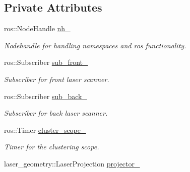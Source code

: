 \subsection*{Private Attributes}
\begin{DoxyCompactItemize}
\item 
ros\+::\+Node\+Handle \hyperlink{classLaserPredictor_a9535842866b44234078f0f69bbeb8539}{nh\+\_\+}\hypertarget{classLaserPredictor_a9535842866b44234078f0f69bbeb8539}{}\label{classLaserPredictor_a9535842866b44234078f0f69bbeb8539}

\begin{DoxyCompactList}\small\item\em Nodehandle for handling namespaces and ros functionality. \end{DoxyCompactList}\item 
ros\+::\+Subscriber \hyperlink{classLaserPredictor_a0cce21a3c340df330f68c4bdc91562f8}{sub\+\_\+front\+\_\+}\hypertarget{classLaserPredictor_a0cce21a3c340df330f68c4bdc91562f8}{}\label{classLaserPredictor_a0cce21a3c340df330f68c4bdc91562f8}

\begin{DoxyCompactList}\small\item\em Subscriber for front laser scanner. \end{DoxyCompactList}\item 
ros\+::\+Subscriber \hyperlink{classLaserPredictor_a3ba0934ebaf60999f241314955038fbf}{sub\+\_\+back\+\_\+}\hypertarget{classLaserPredictor_a3ba0934ebaf60999f241314955038fbf}{}\label{classLaserPredictor_a3ba0934ebaf60999f241314955038fbf}

\begin{DoxyCompactList}\small\item\em Subscriber for back laser scanner. \end{DoxyCompactList}\item 
ros\+::\+Timer \hyperlink{classLaserPredictor_a304d7c60e689819cc6e6398bee80a891}{cluster\+\_\+scope\+\_\+}\hypertarget{classLaserPredictor_a304d7c60e689819cc6e6398bee80a891}{}\label{classLaserPredictor_a304d7c60e689819cc6e6398bee80a891}

\begin{DoxyCompactList}\small\item\em Timer for the clustering scope. \end{DoxyCompactList}\item 
laser\+\_\+geometry\+::\+Laser\+Projection \hyperlink{classLaserPredictor_a02d304374282c92530ffce61fa31dc31}{projector\+\_\+}\hypertarget{classLaserPredictor_a02d304374282c92530ffce61fa31dc31}{}\label{classLaserPredictor_a02d304374282c92530ffce61fa31dc31}


\end{DoxyCompactItemize}
